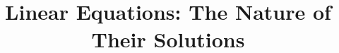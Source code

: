\documentclass{beamer}
\title[Section 2.1]{Linear Equations: The Nature of Their Solutions}
\begin{document}
\begin{frame}
\titlepage
\end{frame}
\end{document}
